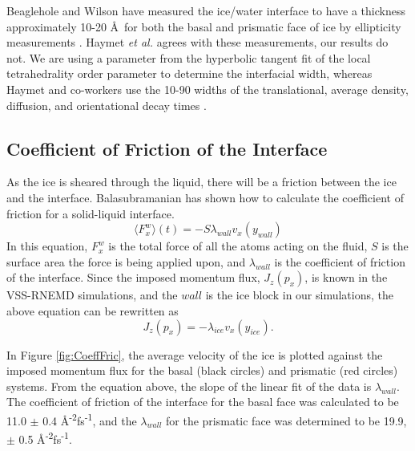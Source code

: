 \documentclass[journal = jpccck, manuscript = article]{achemso}
\begin{document}
Beaglehole and Wilson have measured the ice/water interface to have a thickness approximately 10-20 \AA\ for both the basal and prismatic face of ice by ellipticity measurements \cite{Beaglehole93}. Haymet \emph{et al.} agrees with these measurements, our results do not. We are using a  parameter from the hyperbolic tangent fit of the local tetrahedrality order parameter to determine the interfacial width, whereas Haymet and co-workers use the 10-90 widths of the translational, average density, diffusion, and orientational decay times \cite{Hayward01}.

\subsection{Coefficient of Friction of the Interface}
As the ice is sheared through the liquid, there will be a friction between the ice and the interface. Balasubramanian has shown how to calculate the coefficient of friction for a solid-liquid interface. \cite{Balasubramanian99}
\begin{equation}
\langle F_{x}^{w}\rangle(t)=-S\lambda_{wall}v_{x}(y_{wall})
\end{equation}
In this equation, $F_{x}^{w}$ is the total force of all the atoms acting on the fluid, $S$ is the surface area the force is being applied upon, and $\lambda_{wall}$ is the coefficient of friction of the interface. Since the imposed momentum flux, $J_{z}(p_{x})$, is known in the VSS-RNEMD simulations, and the $wall$ is the ice block in our simulations, the above equation can be rewritten as 
\begin{equation}
J_{z}(p_{x})=-\lambda_{ice}v_{x}(y_{ice}).
\end{equation}

In Figure \ref{fig:CoeffFric}, the average velocity of the ice is plotted against the imposed momentum flux for the basal (black circles) and prismatic (red circles) systems. From the equation above, the slope of the linear fit of the data is $\lambda_{wall}$. The coefficient of friction of the interface for the basal face was calculated to be 11.0 $\pm$ 0.4 \AA\textsuperscript{-2}fs\textsuperscript{-1}, and the $\lambda_{wall}$ for the prismatic face was determined to be 19.9, $\pm$ 0.5 \AA\textsuperscript{-2}fs\textsuperscript{-1}.  
\end{document}
